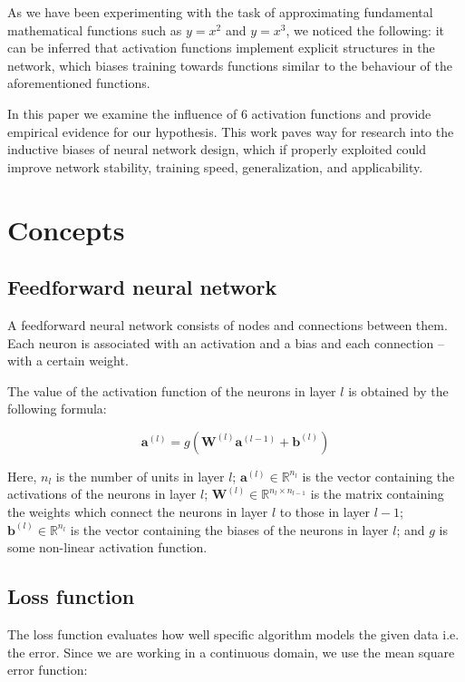 \documentclass{article}
\begin{document}
As we have been experimenting with the task of approximating fundamental mathematical functions such as  $y = x^2$ and $y = x^3$, we noticed the following: it can be inferred that activation functions implement explicit structures in the network, which biases training towards functions similar to the behaviour of the aforementioned functions.

In this paper we examine the influence of 6 activation functions and provide empirical evidence for our hypothesis. This work paves way for research into the inductive biases of neural network design, which if properly exploited could improve network stability, training speed, generalization, and applicability.



\section{Concepts}
   \label{Background}
   
    \subsection{Feedforward neural network}
    A feedforward neural network consists of nodes and connections between them. Each neuron is associated with an activation and a bias and each connection -- with a certain weight.
   
    The value of the activation function of the neurons in layer $l$ is obtained by the following formula:
    
     $$\bm a^{(l)} = g(\bm W^{(l)} \bm a^{(l-1)} + \bm b^{(l)})$$
     
    Here, $n_l$ is the number of units in layer $l$; $\bm a^{(l)} \in \mathbb{R}^{n_l}$ is the vector containing the activations of the neurons in layer $l$; $\bm W^{(l)} \in \mathbb{R}^{n_l \times n_{l-1}}$ is the matrix containing the weights which connect the neurons in layer $l$ to those in layer $l-1$; $\bm b^{(l)} \in \mathbb{R}^{n_l}$ is the vector containing the biases of the neurons in layer $l$; and $g$ is some non-linear activation function.
    
   \subsection{Loss function}
    
    The loss function evaluates how well specific algorithm models the given data i.e. the error. Since we are working in a continuous domain, we use the mean square error function:
    
\end{document}
